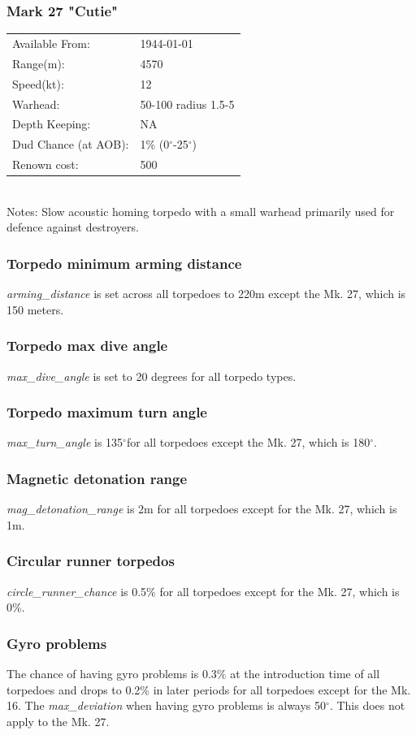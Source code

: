 \documentclass{article}
\newcommand{\degree}{$^{\circ}$}
\begin{document}
\subsubsection{Mark 27 "Cutie"}
\begin{tabular}{l|l}
Available From:& 1944-01-01\\
Range(m):& 4570\\
Speed(kt):&12\\
Warhead:& 50-100 radius 1.5-5\\
Depth Keeping:& NA\\
Dud Chance (at AOB):& 1\% (0\degree-25\degree)\\
Renown cost:& 500\\
\end{tabular} \\
Notes: Slow acoustic homing torpedo with a small warhead primarily used for defence against destroyers.

\subsubsection{Torpedo minimum arming distance}
\emph{arming\_distance} is set across all torpedoes to 220m except the Mk. 27, which is 150 meters.
\subsubsection{Torpedo max dive angle}
\emph{max\_dive\_angle} is set to 20 degrees for all torpedo types.
\subsubsection{Torpedo maximum turn angle}
\emph{max\_turn\_angle} is 135\degree for all torpedoes except the Mk. 27, which is 180\degree.
\subsubsection{Magnetic detonation range}
\emph{mag\_detonation\_range} is 2m for all torpedoes except for the Mk. 27, which is 1m.
\subsubsection{Circular runner torpedos}
\emph{circle\_runner\_chance} is 0.5\% for all torpedoes except for the Mk. 27, which is 0\%.
\subsubsection{Gyro problems}
The chance of having gyro problems is 0.3\% at the introduction time of all torpedoes and drops to 0.2\% in later periods for all torpedoes except for the Mk. 16. The \emph{max\_deviation} when having gyro problems is always 50\degree. This does not apply to the Mk. 27. 
\end{document}
